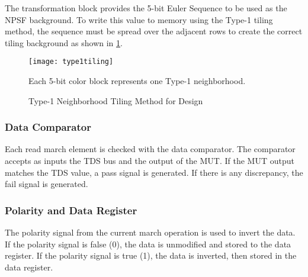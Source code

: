 The transformation block provides the 5-bit Euler Sequence to be used as the NPSF background.  To write this value to memory using the Type-1 tiling method, the sequence must be spread over the adjacent rows to create the correct tiling background as shown in \ref{fig:tiling}.  

\begin{figure}[h!]
  \centering
  \texttt{[image: type1tiling]}
  \caption[Type-1 Neighborhood Tiling Method for Design]{Type-1 Neighborhood Tiling Method for Design}  
   Each 5-bit color block represents one Type-1 neighborhood.
  \label{fig:tiling}
\end{figure}

\subsubsection{Data Comparator}
Each read march element is checked with the data comparator.  The comparator accepts as inputs the TDS bus and the output of the MUT.  If the MUT output matches the TDS value, a pass signal is generated.  If there is any discrepancy, the fail signal is generated.  

\subsubsection{Polarity and Data Register}
The polarity signal from the current march operation is used to invert the data.  If the polarity signal is false (0), the data is unmodified and stored to the data register.  If the polarity signal is true (1), the data is inverted, then stored in the data register.  


